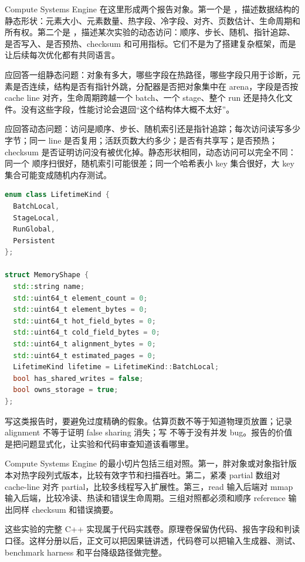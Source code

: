 Compute Systems Engine 在这里形成两个报告对象。第一个是 ，描述数据结构的静态形状：元素大小、元素数量、热字段、冷字段、对齐、页数估计、生命周期和所有权。第二个是 ，描述某次实验的动态访问：顺序、步长、随机、指针追踪、是否写入、是否预热、checksum 和可用指标。它们不是为了搭建复杂框架，而是让后续每次优化都有共同语言。

 应回答一组静态问题：对象有多大，哪些字段在热路径，哪些字段只用于诊断，元素是否连续，结构是否有指针外跳，分配器是否把对象集中在 arena，字段是否按 cache line 对齐，生命周期跨越一个 batch、一个 stage、整个 run 还是持久化文件。没有这些字段，性能讨论会退回“这个结构体大概不太好”。

 应回答动态问题：访问是顺序、步长、随机索引还是指针追踪；每次访问读写多少字节；同一 line 是否复用；活跃页数大约多少；是否有共享写；是否预热；checksum 是否证明访问没有被优化掉。静态形状相同，动态访问可以完全不同：同一个  顺序扫很好，随机索引可能很差；同一个哈希表小 key 集合很好，大 key 集合可能变成随机内存测试。

\begin{lstlisting}[language=C++,caption={MemoryShape 的示例形态}]
enum class LifetimeKind {
  BatchLocal,
  StageLocal,
  RunGlobal,
  Persistent
};

struct MemoryShape {
  std::string name;
  std::uint64_t element_count = 0;
  std::uint64_t element_bytes = 0;
  std::uint64_t hot_field_bytes = 0;
  std::uint64_t cold_field_bytes = 0;
  std::uint64_t alignment_bytes = 0;
  std::uint64_t estimated_pages = 0;
  LifetimeKind lifetime = LifetimeKind::BatchLocal;
  bool has_shared_writes = false;
  bool owns_storage = true;
};
\end{lstlisting}

写这类报告时，要避免过度精确的假象。估算页数不等于知道物理页放置；记录 alignment 不等于证明 false sharing 消失；写  不等于没有并发 bug。报告的价值是把问题显式化，让实验和代码审查知道该看哪里。

Compute Systems Engine 的最小切片包括三组对照。第一，胖对象或对象指针版本对热字段列式版本，比较有效字节和扫描吞吐。第二，紧凑 partial 数组对 cache-line 对齐 partial，比较多线程写入扩展性。第三，read 输入后端对 mmap 输入后端，比较冷读、热读和错误生命周期。三组对照都必须和顺序 reference 输出同样 checksum 和错误摘要。

这些实验的完整 C++ 实现属于代码实践卷。原理卷保留伪代码、报告字段和判读口径。这样分册以后，正文可以把因果链讲透，代码卷可以把输入生成器、测试、benchmark harness 和平台降级路径做完整。

